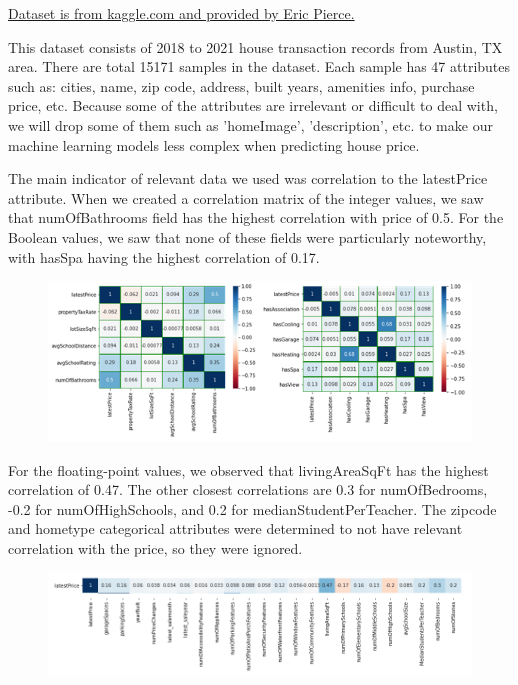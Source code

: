 \documentclass[12pt]{article}
\begin{document}
	\href{https://www.kaggle.com/ericpierce/austinhousingprices}{Dataset is from kaggle.com and provided by Eric Pierce.} 
	
	This dataset consists of 2018 to 2021 house transaction records from Austin, TX area. There are total 15171 samples in the dataset. Each sample has 47 attributes such as: cities, name, zip code, address, built years, amenities info, purchase price, etc. Because some of the attributes are irrelevant or difficult to deal with, we will drop some of them such as 'homeImage', 'description', etc. to make our machine learning models less complex when predicting house price. 
	
	The main indicator of relevant data we used was correlation to the latestPrice attribute. When we created a correlation matrix of the integer values, we saw that numOfBathrooms field has the highest correlation with price of 0.5. For the Boolean values, we saw that none of these fields were particularly noteworthy, with hasSpa having the highest correlation of 0.17.
	
	\begin{figure}[H]
		\label{fig:fig2}
		\includegraphics[width=1\linewidth]{fig2}
	\end{figure}
	
	For the floating-point values, we observed that livingAreaSqFt has the highest correlation of 0.47. The other closest correlations are 0.3 for numOfBedrooms, -0.2 for numOfHighSchools, and 0.2 for medianStudentPerTeacher. The zipcode and hometype categorical attributes were determined to not have relevant correlation with the price, so they were ignored.
	
	\begin{figure}[H]
		\label{fig:fig3}
		\includegraphics[width=1\linewidth]{fig3recreate}
	\end{figure}
	
\end{document}

